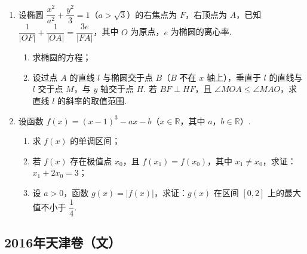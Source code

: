\begin{description}
\begin{enumerate}[leftmargin=5pt]
\begin{enumerate}
\item 设 \(c_n=b_{n+1}^2-b_n^2\)（\(n\in\mathbb{N}^*\)），求证：数列 \(\{c_n\}\) 是等差数列；
\item 设 \(a_1=d\)，\(T_n=\displaystyle\sum_{k=1}^{2n}(-1)^k b_k^2\)（\(n\in\mathbb{N}^*\)），求证：\(\displaystyle\sum_{k=1}^n\dfrac1{T_k}<\dfrac1{2d^2}\).
\end{enumerate}

        \item 设椭圆 \(\dfrac{x^2}{a^2}+\dfrac{y^2}{3}=1\)（\(a>\sqrt3\)）的右焦点为 \(F\)，右顶点为 \(A\)，已知 \(\dfrac1{\lvert OF\rvert}+\dfrac1{\lvert OA\rvert}=\dfrac{3e}{\lvert FA\rvert}\)，其中 \(O\) 为原点，\(e\) 为椭圆的离心率.

\begin{enumerate}
\item 求椭圆的方程；
\item 设过点 \(A\) 的直线 \(l\) 与椭圆交于点 \(B\)（\(B\) 不在 \(x\) 轴上），垂直于 \(l\) 的直线与 \(l\) 交于点 \(M\)，与 \(y\) 轴交于点 \(H\). 若 \(BF\perp HF\)，且 \(\angle MOA\le\angle MAO\)，求直线 \(l\) 的斜率的取值范围.
\end{enumerate}

        \item 设函数 \(f(x)=(x-1)^3-ax-b\)（\(x\in\mathbb{R}\)，其中 \(a\)，\(b\in\mathbb{R}\)）.

\begin{enumerate}
\item 求 \(f(x)\) 的单调区间；
\item 若 \(f(x)\) 存在极值点 \(x_0\)，且 \(f(x_1)=f(x_0)\)，其中 \(x_1\neq x_0\)，求证：\(x_1+2x_0=3\)；
\item 设 \(a>0\)，函数 \(g(x)=\lvert f(x)\rvert\)，求证：\(g(x)\) 在区间 \([0,2]\) 上的最大值不小于 \(\dfrac14\).
\end{enumerate}

    \end{enumerate}

\end{description}


\subsection{2016年天津卷（文）}\label{gk:2016年天津卷（文）}

